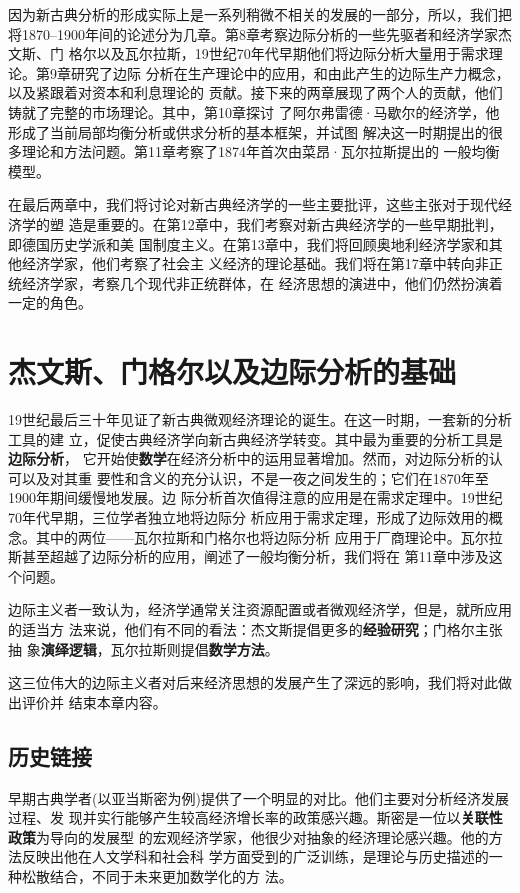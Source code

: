 因为新古典分析的形成实际上是一系列稍微不相关的发展的一部分，所以，我们把
将1870--1900年间的论述分为几章。第8章考察边际分析的一些先驱者和经济学家杰文斯、门
格尔以及瓦尔拉斯，19世纪70年代早期他们将边际分析大量用于需求理论。第9章研究了边际
分析在生产理论中的应用，和由此产生的边际生产力概念，以及紧跟着对资本和利息理论的
贡献。接下来的两章展现了两个人的贡献，他们铸就了完整的市场理论。其中，第10章探讨
了阿尔弗雷德·马歇尔的经济学，他形成了当前局部均衡分析或供求分析的基本框架，并试图
解决这一时期提出的很多理论和方法问题。第11章考察了1874年首次由菜昂·瓦尔拉斯提出的
一般均衡模型。

在最后两章中，我们将讨论对新古典经济学的一些主要批评，这些主张对于现代经济学的塑
造是重要的。在第12章中，我们考察对新古典经济学的一些早期批判，即德国历史学派和美
国制度主义。在第13章中，我们将回顾奥地利经济学家和其他经济学家，他们考察了社会主
义经济的理论基础。我们将在第17章中转向非正统经济学家，考察几个现代非正统群体，在
经济思想的演进中，他们仍然扮演着一定的角色。

\chapter{杰文斯、门格尔以及边际分析的基础}

19世纪最后三十年见证了新古典微观经济理论的诞生。在这一时期，一套新的分析工具的建
立，促使古典经济学向新古典经济学转变。其中最为重要的分析工具是\textbf{边际分析}，
它开始使\textbf{数学}在经济分析中的运用显著增加。然而，对边际分析的认可以及对其重
要性和含义的充分认识，不是一夜之间发生的；它们在1870年至1900年期间缓慢地发展。边
际分析首次值得注意的应用是在需求定理中。19世纪70年代早期，三位学者独立地将边际分
析应用于需求定理，形成了边际效用的概念。其中的两位——瓦尔拉斯和门格尔也将边际分析
应用于厂商理论中。瓦尔拉斯甚至超越了边际分析的应用，阐述了一般均衡分析，我们将在
第11章中涉及这个问题。

边际主义者一致认为，经济学通常关注资源配置或者微观经济学，但是，就所应用的适当方
法来说，他们有不同的看法：杰文斯提倡更多的\textbf{经验研究}；门格尔主张抽
象\textbf{演绎逻辑}，瓦尔拉斯则提倡\textbf{数学方法}。

这三位伟大的边际主义者对后来经济思想的发展产生了深远的影响，我们将对此做出评价并
结束本章内容。

\section{历史链接}

早期古典学者(以亚当斯密为例)提供了一个明显的对比。他们主要对分析经济发展过程、发
现并实行能够产生较高经济增长率的政策感兴趣。斯密是一位以\textbf{关联性政策}为导向的发展型
的宏观经济学家，他很少对抽象的经济理论感兴趣。他的方法反映出他在人文学科和社会科
学方面受到的广泛训练，是理论与历史描述的一种松散结合，不同于未来更加数学化的方
法。

